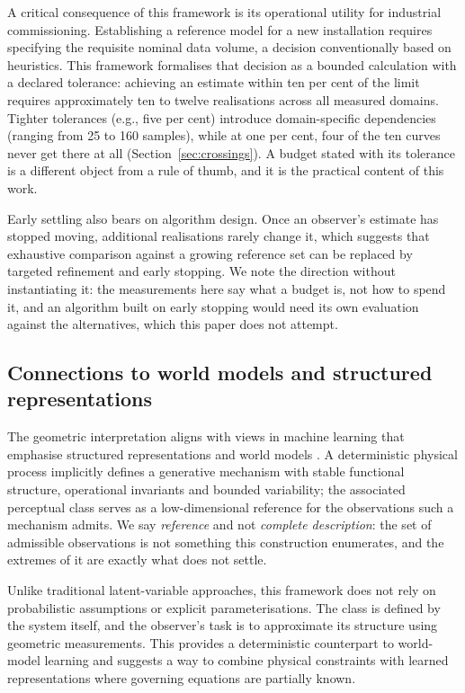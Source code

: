 \documentclass[10pt]{article}
\theoremstyle{plain}
\theoremstyle{definition}
\theoremstyle{remark}
\begin{document}
A critical consequence of this framework is its operational utility for
industrial commissioning. Establishing a reference model for a new installation
requires specifying the requisite nominal data volume, a decision conventionally
based on heuristics. This framework formalises that decision as a bounded
calculation with a declared tolerance: achieving an estimate within ten per cent
of the limit requires approximately ten to twelve realisations across
all measured domains. Tighter tolerances (e.g., five per cent) introduce
domain-specific dependencies (ranging from 25 to 160 samples), while at one per cent, four of the ten curves never get there at all
(Section~\ref{sec:crossings}). A budget stated with its tolerance is a different
object from a rule of thumb, and it is the practical content of this work.

Early settling also bears on algorithm design. Once an observer's estimate has
stopped moving, additional realisations rarely change it, which suggests that
exhaustive comparison against a growing reference set can be replaced by
targeted refinement and early stopping. We note the direction without
instantiating it: the measurements here say what a budget is, not how to spend
it, and an algorithm built on early stopping would need its own evaluation
against the alternatives, which this paper does not attempt.

\subsection{Connections to world models and structured representations}

The geometric interpretation aligns with views in machine learning that
emphasise structured representations and world models
\citep{ha2018world, lecun2022path, bengio2013representation}. A deterministic
physical process implicitly defines a generative mechanism with stable
functional structure, operational invariants and bounded variability; the associated
perceptual class serves as a low-dimensional reference for the observations
such a mechanism admits. We say \emph{reference} and not \emph{complete
description}: the set of admissible observations is not something this
construction enumerates, and the extremes of it are exactly what does not
settle.

Unlike traditional latent-variable approaches, this framework does not rely on
probabilistic assumptions or explicit parameterisations. The class is defined
by the system itself, and the observer's task is to approximate its structure
using geometric measurements. This provides a deterministic counterpart to
world-model learning and suggests a way to combine physical constraints with
learned representations where governing equations are partially known.
\end{document}
